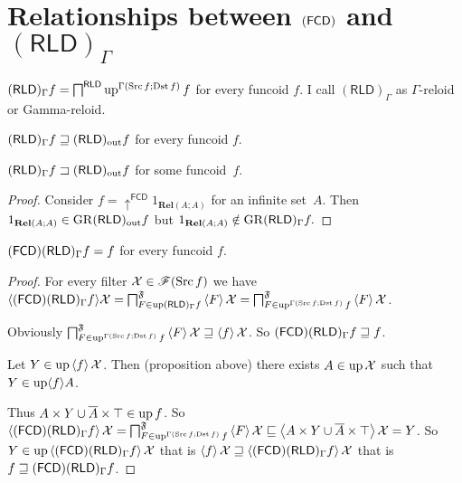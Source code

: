 \section{\texorpdfstring{Relationships between $\protect(\mathsf{FCD})$ and 
$(\mathsf{RLD})_{\Gamma}$}{Relationships between (FCD) and (RLD)\_Gamma}}
\begin{defn}
$(\mathsf{RLD})_{\Gamma}f=\bigsqcap^{\mathsf{RLD}}\operatorname{up}^{\Gamma(\operatorname{Src} f;\operatorname{Dst} f)}f$
for every funcoid $f$. I call $(\mathsf{RLD})_{\Gamma}$ as $\Gamma$-reloid
or Gamma-reloid.\end{defn}
\begin{obvious}
$(\mathsf{RLD})_{\Gamma}f\sqsupseteq(\mathsf{RLD})_{\mathrm{out}} f$ for every funcoid
$f$.\end{obvious}
\begin{example}
$(\mathsf{RLD})_{\Gamma}f\sqsupset(\mathsf{RLD})_{\mathrm{out}} f$ for some funcoid~$f$.\end{example}
\begin{proof}
Consider $f=\uparrow^{\mathsf{FCD}}1_{\mathbf{Rel}(A;A)}$ for an
infinite set~$A$. Then $1_{\mathbf{Rel}(A;A)}\in\operatorname{GR}(\mathsf{RLD})_{\mathrm{out}} f$
but $1_{\mathbf{Rel}(A;A)}\notin\operatorname{GR}(\mathsf{RLD})_{\Gamma}f.$\end{proof}
\begin{lem}
$(\mathsf{FCD})(\mathsf{RLD})_{\Gamma}f=f$ for every funcoid $f$.\end{lem}
\begin{proof}
For every filter $\mathcal{X}\in\mathscr{F}(\operatorname{Src} f)$ we have $\langle(\mathsf{FCD})(\mathsf{RLD})_{\Gamma}f\rangle\mathcal{X}=\bigsqcap_{F\in\operatorname{up}(\mathsf{RLD})_{\Gamma}f}^{\mathfrak{F}}\left\langle F\right\rangle\mathcal{X}=\bigsqcap_{F\in\operatorname{up}^{\Gamma(\operatorname{Src} f;\operatorname{Dst} f)}f}^{\mathfrak{F}}\left\langle F\right\rangle\mathcal{X}$.

Obviously $\bigsqcap_{F\in\operatorname{up}^{\Gamma(\operatorname{Src} f;\operatorname{Dst} f)}f}^{\mathfrak{F}}\left\langle F\right\rangle\mathcal{X}\sqsupseteq\left\langle f\right\rangle\mathcal{X}$.
So $(\mathsf{FCD})(\mathsf{RLD})_{\Gamma}f\sqsupseteq f$.

Let $Y\in\operatorname{up}\left\langle f\right\rangle\mathcal{X}$. Then (proposition above) there
exists $A\in\operatorname{up}\mathcal{X}$ such that $Y\in\operatorname{up}\langle f\rangle A$.

Thus $A\times Y\cup\overline{A}\times\top\in\operatorname{up} f$. So $\left\langle (\mathsf{FCD})(\mathsf{RLD})_{\Gamma}f\right\rangle\mathcal{X}=\bigsqcap_{F\in\operatorname{up}^{\Gamma(\operatorname{Src} f;\operatorname{Dst} f)}f}^{\mathfrak{F}}\left\langle F\right\rangle\mathcal{X}\sqsubseteq\left\langle A\times Y\cup\overline{A}\times\top\right\rangle\mathcal{X}=Y$.
So $Y\in\operatorname{up}\left\langle (\mathsf{FCD})(\mathsf{RLD})_{\Gamma}f\right\rangle\mathcal{X}$ that
is $\left\langle f\right\rangle\mathcal{X}\sqsupseteq\left\langle (\mathsf{FCD})(\mathsf{RLD})_{\Gamma}f\right\rangle\mathcal{X}$
that is $f\sqsupseteq(\mathsf{FCD})(\mathsf{RLD})_{\Gamma}f$.\end{proof}
